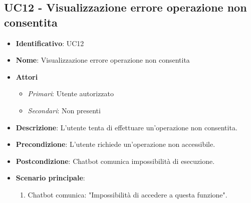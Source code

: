 \subsection{UC12 - Visualizzazione errore operazione non consentita}
\begin{itemize}
	\item \textbf{Identificativo}: UC12
	\item \textbf{Nome}:  Visualizzazione errore operazione non consentita
	\item \textbf{Attori}
	\begin{itemize} 
		\item \textit{Primari}: Utente autorizzato
		\item \textit{Secondari}: Non presenti
	\end{itemize}
	\item \textbf{Descrizione}: L'utente tenta di effettuare un'operazione non consentita.
	\item \textbf{Precondizione}:  L'utente richiede un'operazione non accessibile.
	\item \textbf{Postcondizione}: Chatbot comunica impossibilità di esecuzione.
	\item \textbf{Scenario principale}: \begin{enumerate}
		\item Chatbot comunica: "Impossibilità di accedere a questa funzione".
	\end{enumerate}
\end{itemize}